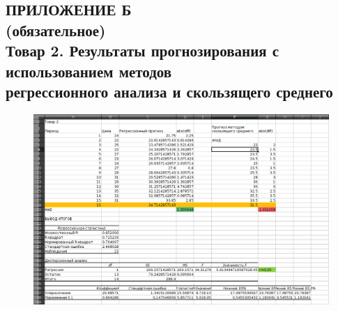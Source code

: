 \renewcommand{\thefigure}{\Asbuk{section}.\arabic{figure}}
\renewcommand{\thetable}{\Asbuk{section}.\arabic{table}}
\renewcommand{\thelstlisting}{\Asbuk{section}.\arabic{lstlisting}}

\begin{landscape}
\section*{%
  ПРИЛОЖЕНИЕ Б \\
  (обязательное) \\
  Товар 2. Результаты прогнозирования с использованием методов \\
  регрессионного анализа и скользящего среднего
}

\pagestyle{fancy}
\fancyhf{}  %
\fancyfoot[R]{\thepage}
\renewcommand{\headrulewidth}{0pt}
\renewcommand{\footrulewidth}{0pt}

\setlength{\headheight}{10mm}
\setlength{\headsep}{\baselineskip}

\thispagestyle{plain}

\setcounter{section}{1}
\setcounter{figure}{0}
\setcounter{table}{0}
\setcounter{lstlisting}{0}

\begin{figure}[h!]
  \centering
  \includegraphics[width=175mm]{pic/tovar_2}
\end{figure}

\end{landscape}
